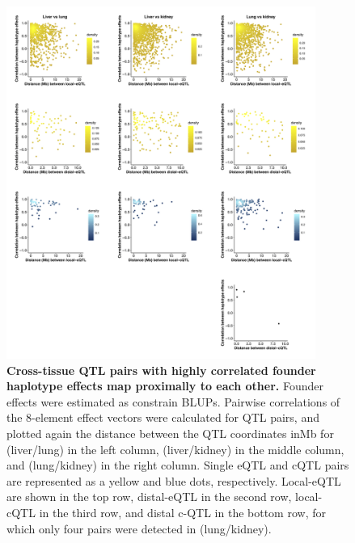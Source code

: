 \documentclass[9pt,twocolumn,twoside]{gsajnl}
\begin{document}
\begin{figure}[hp]
\renewcommand{\familydefault}{\sfdefault}\normalfont
\centering
\includegraphics[width=0.9\textwidth, trim={0in 0in 0in 0in}, clip]{figs/effect_size_cor_by_dist.png}
\caption{\textbf{Cross-tissue QTL pairs with highly correlated founder haplotype effects map proximally to each other.} 
Founder effects were estimated as constrain BLUPs. Pairwise correlations of the 8-element effect vectors were calculated for QTL pairs, and plotted again the distance between the QTL coordinates inMb for (liver/lung) in the left column, (liver/kidney) in the middle column, and (lung/kidney) in the right column. Single eQTL and cQTL pairs are represented as a yellow and blue dots, respectively. Local-eQTL are shown in the top row, distal-eQTL in the second row, local-cQTL in the third row, and distal c-QTL in the bottom row, for which only four pairs were detected in (lung/kidney).
\label{fig:qtl_cor_by_distance_comparison}}
\end{figure}

\clearpage
\end{document}
